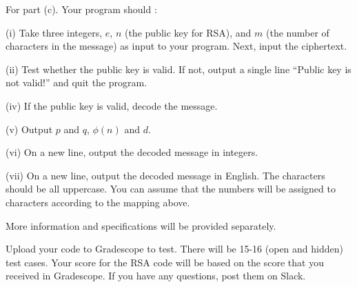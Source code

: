 \documentclass{article}
\begin{document}
\begin{problem}
\begin{description}
\end{description}

\vspace{0.2in}
\noindent For part (c). Your program should :
\begin{description}

	\item (i) Take three integers, $e$, $n$ (the public key for RSA), and $m$ (the number of characters in the message) as input to your program. Next, input the ciphertext.
	\item (ii) Test whether the public key is valid. If not, output a single line ``Public key is not valid!'' and quit the program.
	\item (iv) If the public key is valid, decode the message.
	\item (v) Output $p$ and $q$, $\phi(n)$ and $d$.
	\item (vi) On a new line, output the decoded message in integers.
	\item (vii) On a new line, output the decoded message in English. The characters should be all uppercase. You can assume that the numbers will be assigned to characters according to the mapping above.
 
\end{description}

\noindent More information and specifications will be provided separately.

\vspace{0.2in}
\noindent Upload your code to Gradescope to test. There will be 15-16 (open and hidden) test cases.  Your score for the RSA code will be based on the score that you received in Gradescope. If you have any questions, post them on Slack.


\end{problem}
\vspace{0.2in}

\end{document}
